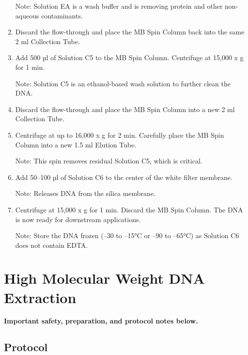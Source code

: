 \documentclass[
]{book}
\begin{document}
\begin{enumerate}
  Note: Solution EA is a wash buffer and is removing protein and other non-aqueous contaminants.
\item
  Discard the flow-through and place the MB Spin Column back into the same 2 ml Collection Tube.
\item
  Add 500 µl of Solution C5 to the MB Spin Column. Centrifuge at 15,000 x g for 1 min.

  Note: Solution C5 is an ethanol-based wash solution to further clean the DNA.
\item
  Discard the flow-through and place the MB Spin Column into a new 2 ml Collection Tube.
\item
  Centrifuge at up to 16,000 x g for 2 min. Carefully place the MB Spin Column into a new 1.5 ml Elution Tube.

  Note: This spin removes residual Solution C5, which is critical.
\item
  Add 50--100 µl of Solution C6 to the center of the white filter membrane.

  Note: Releases DNA from the silica membrane.
\item
  Centrifuge at 15,000 x g for 1 min. Discard the MB Spin Column. The DNA is now ready for downstream applications.

  Note: Store the DNA frozen (--30 to --15°C or --90 to --65°C) as Solution C6 does not contain EDTA.
\end{enumerate}

\hypertarget{high-molecular-weight-dna-extraction}{%
\chapter{\texorpdfstring{\textbf{High Molecular Weight DNA Extraction}}{High Molecular Weight DNA Extraction}}\label{high-molecular-weight-dna-extraction}}

\textbf{Important safety, preparation, and protocol notes below.}

\hypertarget{protocol}{%
\section{\texorpdfstring{\textbf{Protocol}}{Protocol}}\label{protocol}}
\end{document}
